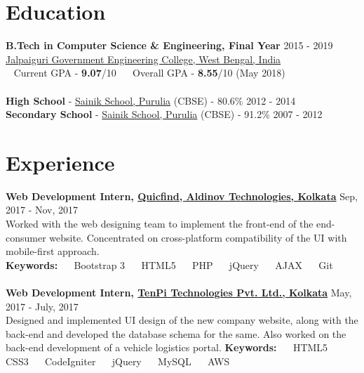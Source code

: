 \documentclass[margin, centered]{res}
\begin{document}
\begin{resume}

\section{Education}
\textbf{B.Tech in Computer Science \& Engineering, Final Year} \hfill 2015 - 2019 \\
\href{http://jgec.ac.in/}{Jalpaiguri Government Engineering College, West Bengal, India} \\
\hspace*{0.6em}\textbullet~ Current GPA - \textbf{9.07}/10 ~\textbullet~ Overall GPA - \textbf{8.55}/10 (May 2018)
\\
\\
\textbf{High School} - \href{http://sainikschoolpurulia.com/}{Sainik School, Purulia} (CBSE) - 80.6\% \hfill 2012 - 2014 \\
\textbf{Secondary School} - \href{http://sainikschoolpurulia.com/}{Sainik School, Purulia} (CBSE) - 91.2\% \hfill 2007 - 2012
 
\section{Experience}
\textbf{Web Development Intern, \href{http://www.quicfind.com}{Quicfind, Aldinov Technologies, Kolkata}} \hfill Sep, 2017 - Nov, 2017\\
Worked with the web designing team to implement the front-end of the end-consumer website. Concentrated on cross-platform compatibility of the UI with mobile-first approach.\\
\textbf{Keywords:} ~\textbullet~ Bootstrap 3 ~\textbullet~ HTML5 ~\textbullet~ PHP ~\textbullet~ jQuery ~\textbullet~ AJAX ~\textbullet~ Git\\
\\
\textbf{Web Development Intern, \href{http://www.tenpitech.com/}{TenPi Technologies Pvt. Ltd., Kolkata}} \hfill May, 2017 - July, 2017\\
Designed and implemented UI design of the new company website, along with the back-end and developed the database schema for the same. Also worked on the back-end development of a vehicle logistics portal.
\textbf{Keywords:} ~\textbullet~ HTML5 ~\textbullet~ CSS3 ~\textbullet~ CodeIgniter ~\textbullet~ jQuery ~\textbullet~ MySQL ~\textbullet~ AWS

\end{resume}
\end{document}
